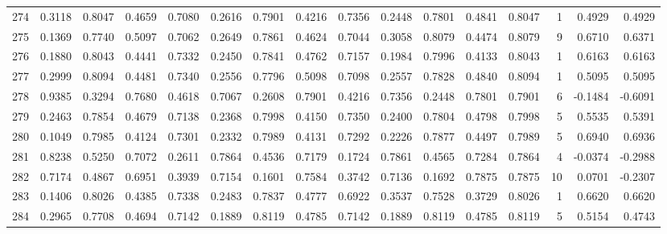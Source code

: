 \begin{tabular}{lrrrrrrrrrrrrrrr}
274 &      0.3118 &  0.8047 &  0.4659 &  0.7080 &  0.2616 &  0.7901 &  0.4216 &  0.7356 &  0.2448 &  0.7801 &   0.4841 &     0.8047 &      1 &                    0.4929 &                     0.4929 \\
275 &      0.1369 &  0.7740 &  0.5097 &  0.7062 &  0.2649 &  0.7861 &  0.4624 &  0.7044 &  0.3058 &  0.8079 &   0.4474 &     0.8079 &      9 &                    0.6710 &                     0.6371 \\
276 &      0.1880 &  0.8043 &  0.4441 &  0.7332 &  0.2450 &  0.7841 &  0.4762 &  0.7157 &  0.1984 &  0.7996 &   0.4133 &     0.8043 &      1 &                    0.6163 &                     0.6163 \\
277 &      0.2999 &  0.8094 &  0.4481 &  0.7340 &  0.2556 &  0.7796 &  0.5098 &  0.7098 &  0.2557 &  0.7828 &   0.4840 &     0.8094 &      1 &                    0.5095 &                     0.5095 \\
278 &      0.9385 &  0.3294 &  0.7680 &  0.4618 &  0.7067 &  0.2608 &  0.7901 &  0.4216 &  0.7356 &  0.2448 &   0.7801 &     0.7901 &      6 &                   -0.1484 &                    -0.6091 \\
279 &      0.2463 &  0.7854 &  0.4679 &  0.7138 &  0.2368 &  0.7998 &  0.4150 &  0.7350 &  0.2400 &  0.7804 &   0.4798 &     0.7998 &      5 &                    0.5535 &                     0.5391 \\
280 &      0.1049 &  0.7985 &  0.4124 &  0.7301 &  0.2332 &  0.7989 &  0.4131 &  0.7292 &  0.2226 &  0.7877 &   0.4497 &     0.7989 &      5 &                    0.6940 &                     0.6936 \\
281 &      0.8238 &  0.5250 &  0.7072 &  0.2611 &  0.7864 &  0.4536 &  0.7179 &  0.1724 &  0.7861 &  0.4565 &   0.7284 &     0.7864 &      4 &                   -0.0374 &                    -0.2988 \\
282 &      0.7174 &  0.4867 &  0.6951 &  0.3939 &  0.7154 &  0.1601 &  0.7584 &  0.3742 &  0.7136 &  0.1692 &   0.7875 &     0.7875 &     10 &                    0.0701 &                    -0.2307 \\
283 &      0.1406 &  0.8026 &  0.4385 &  0.7338 &  0.2483 &  0.7837 &  0.4777 &  0.6922 &  0.3537 &  0.7528 &   0.3729 &     0.8026 &      1 &                    0.6620 &                     0.6620 \\
284 &      0.2965 &  0.7708 &  0.4694 &  0.7142 &  0.1889 &  0.8119 &  0.4785 &  0.7142 &  0.1889 &  0.8119 &   0.4785 &     0.8119 &      5 &                    0.5154 &                     0.4743 \\

\end{tabular}
